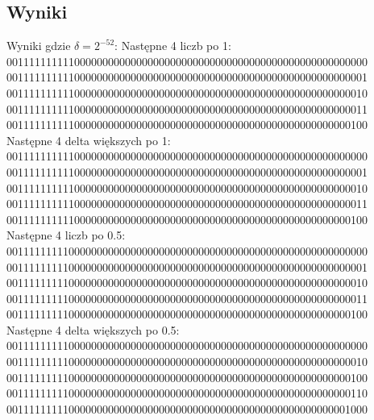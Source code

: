 \documentclass{article}
\begin{document}
\subsection{Wyniki}
Wyniki gdzie $\delta=2^{-52}$: 
Następne 4 liczb po 1:\\
0011111111110000000000000000000000000000000000000000000000000000\\
0011111111110000000000000000000000000000000000000000000000000001\\
0011111111110000000000000000000000000000000000000000000000000010\\
0011111111110000000000000000000000000000000000000000000000000011\\
0011111111110000000000000000000000000000000000000000000000000100\\
Następne 4 delta większych po 1:\\
0011111111110000000000000000000000000000000000000000000000000000\\
0011111111110000000000000000000000000000000000000000000000000001\\
0011111111110000000000000000000000000000000000000000000000000010\\
0011111111110000000000000000000000000000000000000000000000000011\\
0011111111110000000000000000000000000000000000000000000000000100\\
Następne 4 liczb po 0.5:\\
0011111111100000000000000000000000000000000000000000000000000000\\
0011111111100000000000000000000000000000000000000000000000000001\\
0011111111100000000000000000000000000000000000000000000000000010\\
0011111111100000000000000000000000000000000000000000000000000011\\
0011111111100000000000000000000000000000000000000000000000000100\\
Następne 4 delta większych po 0.5:\\
0011111111100000000000000000000000000000000000000000000000000000\\
0011111111100000000000000000000000000000000000000000000000000010\\
0011111111100000000000000000000000000000000000000000000000000100\\
0011111111100000000000000000000000000000000000000000000000000110\\
0011111111100000000000000000000000000000000000000000000000001000\\
\end{document}
